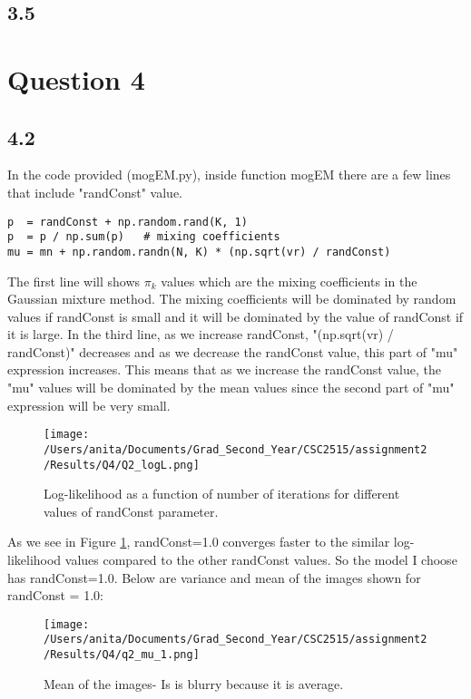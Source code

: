 \documentclass[10pt]{article}
\begin{document}
\subsection*{3.5}

\section*{Question 4}
\subsection*{4.2}
In the code provided (mogEM.py), inside function mogEM there are a few lines that include "randConst" value.
\begin{verbatim}
p  = randConst + np.random.rand(K, 1)
p  = p / np.sum(p)   # mixing coefficients
mu = mn + np.random.randn(N, K) * (np.sqrt(vr) / randConst)
\end{verbatim}
The first line will shows $\pi_k$ values which are the mixing coefficients in the Gaussian mixture method. The mixing coefficients will be dominated by random values if randConst is small and it will be dominated by the value of randConst if it is large.
In the third line, as we increase randConst, "(np.sqrt(vr) / randConst)" decreases and as we decrease the randConst value, this part of "mu" expression increases. This means that as we increase the randConst value, the "mu" values will be dominated by the mean values since the second part of "mu" expression will be very small.


\begin{figure}[H]
	\centering
	\texttt{[image: /Users/anita/Documents/Grad\_Second\_Year/CSC2515/assignment2/Results/Q4/Q2\_logL.png]}
	\caption{Log-likelihood as a function of number of iterations for different values of randConst parameter.}
	\label{fig:q4_log_iter}
\end{figure}
As we see in Figure \ref{fig:q4_log_iter}, randConst=1.0 converges faster to the similar log-likelihood values compared to the other randConst values. So the model I choose has randConst=1.0.
Below are variance and mean of the images shown for randConst = 1.0:
\begin{figure}[H]
	\centering
	\texttt{[image: /Users/anita/Documents/Grad\_Second\_Year/CSC2515/assignment2/Results/Q4/q2\_mu\_1.png]}
	\caption{Mean of the images- Is is blurry because it is average.}
	\label{fig:q4.2_mu}
\end{figure}
\end{document}
